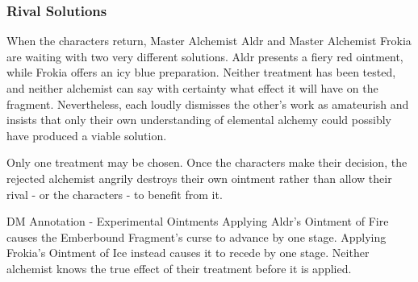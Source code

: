 \subsubsection*{Rival Solutions}
{\entryfont When the characters return, Master Alchemist Aldr and Master Alchemist Frokia are waiting with two very different solutions. Aldr presents a fiery red ointment, while Frokia offers an icy blue preparation. Neither treatment has been tested, and neither alchemist can say with certainty what effect it will have on the fragment. Nevertheless, each loudly dismisses the other's work as amateurish and insists that only their own understanding of elemental alchemy could possibly have produced a viable solution.

Only one treatment may be chosen. Once the characters make their decision, the rejected alchemist angrily destroys their own ointment rather than allow their rival - or the characters - to benefit from it.}
\begingroup
	\DndSetThemeColor[PhbTan]
	\begin{DndComment}{DM Annotation - Experimental Ointments}
		Applying Aldr's Ointment of Fire causes the Emberbound Fragment's curse to advance by one stage. Applying Frokia's Ointment of Ice instead causes it to recede by one stage. Neither alchemist knows the true effect of their treatment before it is applied.
	\end{DndComment}
\endgroup